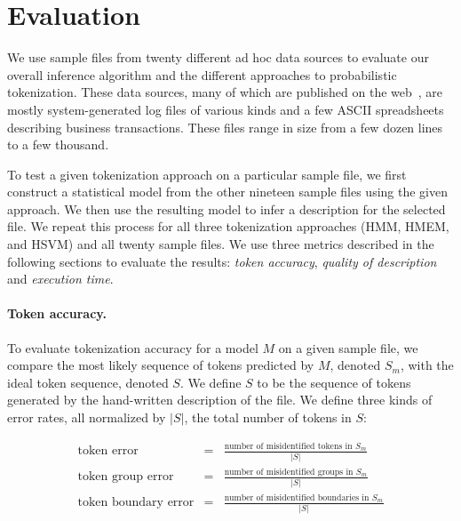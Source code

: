 \section{Evaluation}\label{sec:eval}
We use sample files from twenty different ad hoc data sources to
evaluate our overall inference algorithm and the different
approaches to probabilistic tokenization.
These data sources, many of which are published on the
web~\cite{padsweb}, are mostly system-generated log files of various
kinds and a few ASCII spreadsheets describing business transactions.
These files range in size from a few dozen lines to a few
thousand.

To test a given tokenization approach on a particular sample file, we
first construct a statistical model from the
other nineteen sample files using the given approach.  We then use the
resulting model to infer a 
description for the selected file.  We repeat this process for all
three tokenization approaches (HMM, HMEM, and HSVM) and all twenty
sample files.  We use three metrics described in the following
sections to evaluate the results: {\em token accuracy},
{\em quality of description} and {\em execution time}.

\paragraph*{Token accuracy.}
To evaluate tokenization accuracy for a model $M$ on a given sample
file, we compare the most likely sequence of tokens predicted by $M$,
denoted $S_m$, with the ideal token sequence, denoted $S$.  We define
$S$ to be the sequence of tokens generated by the hand-written \pads{}
description of the file.  We define three kinds of error rates, all
normalized by $|S|$, the total number of tokens in $S$:

\begin{eqnarray*}
\textrm{token error} & = & \frac{\textrm{number of misidentified tokens in $S_m$}}
    {|S|} \\[1ex]
\textrm{token group error} & = & \frac{\textrm{number of misidentified groups in $S_m$}}
    {|S|}\\[1ex]
\textrm{token boundary error} & = & \frac{\textrm{number of misidentified boundaries in $S_m$}}
    {|S|}
\end{eqnarray*}

